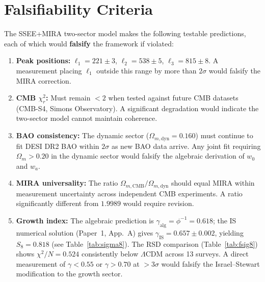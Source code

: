 \documentclass[12pt,a4paper]{article}
\begin{document}
\section{Falsifiability Criteria}
\label{sec:falsifiability}

The SSEE+MIRA two-sector model makes the following testable predictions,
each of which would \textbf{falsify} the framework if violated:

\begin{enumerate}
  \item \textbf{Peak positions:} $\ell_1=221\pm3$, $\ell_2=538\pm5$, $\ell_3=815\pm8$.
    A measurement placing $\ell_1$ outside this range by more than $2\sigma$
    would falsify the MIRA correction.

  \item \textbf{CMB $\chi^2_r$:} Must remain $<2$ when tested against future
    CMB datasets (CMB-S4, Simons Observatory). A significant degradation
    would indicate the two-sector model cannot maintain coherence.

  \item \textbf{BAO consistency:} The dynamic sector ($\Omega_{m,\mathrm{dyn}}=0.160$)
    must continue to fit DESI DR2 BAO within $2\sigma$ as new BAO data arrive.
    Any joint fit requiring $\Omega_m>0.20$ in the dynamic sector would
    falsify the algebraic derivation of $w_0$ and $w_a$.

  \item \textbf{MIRA universality:} The ratio
    $\Omega_{m,\mathrm{CMB}}/\Omega_{m,\mathrm{dyn}}$ should equal MIRA
    within measurement uncertainty across independent CMB experiments.
    A ratio significantly different from $1.9989$ would require revision.

  \item \textbf{Growth index:} The algebraic prediction is $\gamma_\mathrm{alg}=\phi^{-1}=0.618$;
    the IS numerical solution (Paper~1, App.~A) gives $\gamma_\mathrm{IS}=0.657\pm0.002$,
    yielding $S_8=0.818$ (see Table~\ref{tab:sigma8}).
    The RSD comparison (Table~\ref{tab:fsig8}) shows $\chi^2/N=0.524$
    consistently below $\Lambda$CDM across 13 surveys.
    A direct measurement of $\gamma<0.55$ or $\gamma>0.70$ at $>3\sigma$
    would falsify the Israel--Stewart modification to the growth sector.
\end{enumerate}
\end{document}
